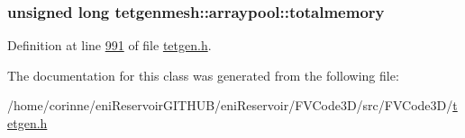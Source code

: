 \subsubsection[{\texorpdfstring{totalmemory}{totalmemory}}]{\setlength{\rightskip}{0pt plus 5cm}unsigned long tetgenmesh\+::arraypool\+::totalmemory}\hypertarget{classtetgenmesh_1_1arraypool_af264f265d5752e75f50adea472ecd59f}{}\label{classtetgenmesh_1_1arraypool_af264f265d5752e75f50adea472ecd59f}


Definition at line \hyperlink{tetgen_8h_source_l00991}{991} of file \hyperlink{tetgen_8h_source}{tetgen.\+h}.



The documentation for this class was generated from the following file\+:\begin{DoxyCompactItemize}
\item 
/home/corinne/eni\+Reservoir\+G\+I\+T\+H\+U\+B/eni\+Reservoir/\+F\+V\+Code3\+D/src/\+F\+V\+Code3\+D/\hyperlink{tetgen_8h}{tetgen.\+h}\end{DoxyCompactItemize}
